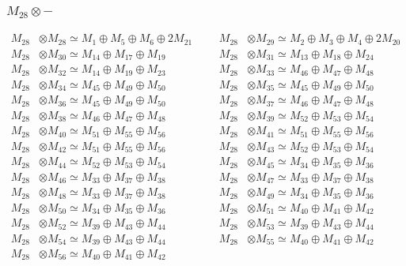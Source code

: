 \subsubsection{$ M_{28}\otimes -$}
\begin{align*}
M_{28} &\otimes M_{28} \simeq M_{1} \oplus M_{5} \oplus M_{6} \oplus 2M_{21} &&& M_{28} &\otimes M_{29} \simeq M_{2} \oplus M_{3} \oplus M_{4} \oplus 2M_{20}\\
M_{28} &\otimes M_{30} \simeq M_{14} \oplus M_{17} \oplus M_{19} &&& M_{28} &\otimes M_{31} \simeq M_{13} \oplus M_{18} \oplus M_{24}\\
M_{28} &\otimes M_{32} \simeq M_{14} \oplus M_{19} \oplus M_{23} &&& M_{28} &\otimes M_{33} \simeq M_{46} \oplus M_{47} \oplus M_{48}\\
M_{28} &\otimes M_{34} \simeq M_{45} \oplus M_{49} \oplus M_{50} &&& M_{28} &\otimes M_{35} \simeq M_{45} \oplus M_{49} \oplus M_{50}\\
M_{28} &\otimes M_{36} \simeq M_{45} \oplus M_{49} \oplus M_{50} &&& M_{28} &\otimes M_{37} \simeq M_{46} \oplus M_{47} \oplus M_{48}\\
M_{28} &\otimes M_{38} \simeq M_{46} \oplus M_{47} \oplus M_{48} &&& M_{28} &\otimes M_{39} \simeq M_{52} \oplus M_{53} \oplus M_{54}\\
M_{28} &\otimes M_{40} \simeq M_{51} \oplus M_{55} \oplus M_{56} &&& M_{28} &\otimes M_{41} \simeq M_{51} \oplus M_{55} \oplus M_{56}\\
M_{28} &\otimes M_{42} \simeq M_{51} \oplus M_{55} \oplus M_{56} &&& M_{28} &\otimes M_{43} \simeq M_{52} \oplus M_{53} \oplus M_{54}\\
M_{28} &\otimes M_{44} \simeq M_{52} \oplus M_{53} \oplus M_{54} &&& M_{28} &\otimes M_{45} \simeq M_{34} \oplus M_{35} \oplus M_{36}\\
M_{28} &\otimes M_{46} \simeq M_{33} \oplus M_{37} \oplus M_{38} &&& M_{28} &\otimes M_{47} \simeq M_{33} \oplus M_{37} \oplus M_{38}\\
M_{28} &\otimes M_{48} \simeq M_{33} \oplus M_{37} \oplus M_{38} &&& M_{28} &\otimes M_{49} \simeq M_{34} \oplus M_{35} \oplus M_{36}\\
M_{28} &\otimes M_{50} \simeq M_{34} \oplus M_{35} \oplus M_{36} &&& M_{28} &\otimes M_{51} \simeq M_{40} \oplus M_{41} \oplus M_{42}\\
M_{28} &\otimes M_{52} \simeq M_{39} \oplus M_{43} \oplus M_{44} &&& M_{28} &\otimes M_{53} \simeq M_{39} \oplus M_{43} \oplus M_{44}\\
M_{28} &\otimes M_{54} \simeq M_{39} \oplus M_{43} \oplus M_{44} &&& M_{28} &\otimes M_{55} \simeq M_{40} \oplus M_{41} \oplus M_{42}\\
M_{28} &\otimes M_{56} \simeq M_{40} \oplus M_{41} \oplus M_{42}
\end{align*}

